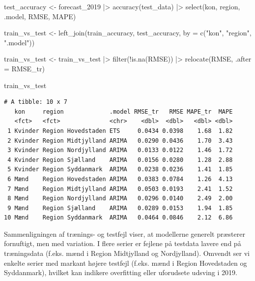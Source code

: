 \documentclass[
]{article}
\newenvironment{Shaded}{\begin{snugshade}}{\end{snugshade}}
\newcommand{\AttributeTok}[1]{\textcolor[rgb]{0.40,0.45,0.13}{#1}}
\newcommand{\FunctionTok}[1]{\textcolor[rgb]{0.28,0.35,0.67}{#1}}
\newcommand{\NormalTok}[1]{\textcolor[rgb]{0.00,0.23,0.31}{#1}}
\newcommand{\OtherTok}[1]{\textcolor[rgb]{0.00,0.23,0.31}{#1}}
\newcommand{\SpecialCharTok}[1]{\textcolor[rgb]{0.37,0.37,0.37}{#1}}
\newcommand{\StringTok}[1]{\textcolor[rgb]{0.13,0.47,0.30}{#1}}
\begin{document}
\begin{Shaded}
\begin{Highlighting}[]
\NormalTok{test\_accuracy }\OtherTok{\textless{}{-}}\NormalTok{ forecast\_2019 }\SpecialCharTok{|\textgreater{}}
  \FunctionTok{accuracy}\NormalTok{(test\_data) }\SpecialCharTok{|\textgreater{}}
  \FunctionTok{select}\NormalTok{(kon, region, .model, RMSE, MAPE)}

\NormalTok{train\_vs\_test }\OtherTok{\textless{}{-}} \FunctionTok{left\_join}\NormalTok{(train\_accuracy, test\_accuracy,}
                           \AttributeTok{by =} \FunctionTok{c}\NormalTok{(}\StringTok{"kon"}\NormalTok{, }\StringTok{"region"}\NormalTok{, }\StringTok{".model"}\NormalTok{))}

\NormalTok{train\_vs\_test }\OtherTok{\textless{}{-}}\NormalTok{ train\_vs\_test }\SpecialCharTok{|\textgreater{}} 
  \FunctionTok{filter}\NormalTok{(}\SpecialCharTok{!}\FunctionTok{is.na}\NormalTok{(RMSE)) }\SpecialCharTok{|\textgreater{}}
  \FunctionTok{relocate}\NormalTok{(RMSE, }\AttributeTok{.after =}\NormalTok{ RMSE\_tr)}

\NormalTok{train\_vs\_test}
\end{Highlighting}
\end{Shaded}

\begin{verbatim}
# A tibble: 10 x 7
   kon     region             .model RMSE_tr   RMSE MAPE_tr  MAPE
   <fct>   <fct>              <chr>    <dbl>  <dbl>   <dbl> <dbl>
 1 Kvinder Region Hovedstaden ETS     0.0434 0.0398    1.68  1.82
 2 Kvinder Region Midtjylland ARIMA   0.0290 0.0436    1.70  3.43
 3 Kvinder Region Nordjylland ARIMA   0.0133 0.0122    1.46  1.72
 4 Kvinder Region Sjælland    ARIMA   0.0156 0.0280    1.28  2.88
 5 Kvinder Region Syddanmark  ARIMA   0.0238 0.0236    1.41  1.85
 6 Mænd    Region Hovedstaden ARIMA   0.0383 0.0784    1.26  4.13
 7 Mænd    Region Midtjylland ARIMA   0.0503 0.0193    2.41  1.52
 8 Mænd    Region Nordjylland ARIMA   0.0296 0.0140    2.49  2.00
 9 Mænd    Region Sjælland    ARIMA   0.0289 0.0153    1.94  1.85
10 Mænd    Region Syddanmark  ARIMA   0.0464 0.0846    2.12  6.86
\end{verbatim}

Sammenligningen af trænings- og testfejl viser, at modellerne generelt
præsterer fornuftigt, men med variation. I flere serier er fejlene på
testdata lavere end på træningsdata (f.eks. mænd i Region Midtjylland og
Nordjylland). Omvendt ser vi enkelte serier med markant højere testfejl
(f.eks. mænd i Region Hovedstaden og Syddanmark), hvilket kan indikere
overfitting eller uforudsete udsving i 2019.
\end{document}
